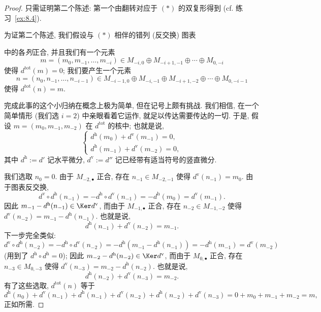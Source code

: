 \begin{proof}
只需证明第二个陈述: 第一个由翻转对应于 $(*)$ 的双复形得到 (cf. 练习~\ref{ex:8.4}).

为证第二个陈述, 我们假设与 $(*)$ 相伴的错列 (反交换) 图表
\begin{center}
\end{center}
中的各\emph{列}正合, 并且我们有一个元素
\[
m=(m_0, m_{-1}, \dots, m_{-i})\in M_{-i,0}\oplus M_{-i+1,-1}\oplus \cdots \oplus M_{0,-i}
\]
使得 $d^{\mathrm{tot}}(m)=0$; 我们要产生一个元素
\[
n=(n_0, n_{-1}, \dots, n_{-i-1})\in M_{-i-1,0}\oplus M_{-i,-1}\oplus M_{-i+1,-2}\oplus \cdots \oplus M_{0,-i-1}
\]
使得 $d^{\mathrm{tot}}(n)=m$.

完成此事的这个小归纳在概念上极为简单, 但在记号上颇有挑战. 我们相信, 在一个简单情形 (我们选 $i=2$) 中亲眼看着它运作, 就足以传达需要传达的一切. 于是, 假设 $m=(m_0,m_{-1},m_{-2})$ 在 $d^{\mathrm{tot}}$ 的核中; 也就是说,
\[
\begin{cases}
d^{\mathrm h}(m_0)+d^{\mathrm v}(m_{-1})=0,\\
d^{\mathrm h}(m_{-1})+d^{\mathrm v}(m_{-2})=0,
\end{cases}
\]
其中 $d^{\mathrm h}:=d'$ 记水平微分, $d^{\mathrm v}:=d''$ 记已经带有适当符号的竖直微分.

我们选取 $n_0=0$. 由于 $M_{-2,\bullet}$ 正合, 存在 $n_{-1}\in M_{-2,-1}$ 使得 $d^{\mathrm v}(n_{-1})=m_0$. 由于图表反交换,
\[
d^{\mathrm v}\circ d^{\mathrm h}(n_{-1})=-d^{\mathrm h}\circ d^{\mathrm v}(n_{-1})=-d^{\mathrm h}(m_0)=d^{\mathrm v}(m_{-1}).
\]
因此 $m_{-1}-d^{\mathrm h}(n_{-1})\in \Ker d^{\mathrm v}$, 而由于 $M_{-1,\bullet}$ 正合, 存在 $n_{-2}\in M_{-1,-2}$ 使得 $d^{\mathrm v}(n_{-2})=m_{-1}-d^{\mathrm h}(n_{-1})$. 也就是说,
\[
d^{\mathrm h}(n_{-1})+d^{\mathrm v}(n_{-2})=m_{-1}.
\]
下一步完全类似:
\[
d^{\mathrm v}\circ d^{\mathrm h}(n_{-2})=-d^{\mathrm h}\circ d^{\mathrm v}(n_{-2})=-d^{\mathrm h}(m_{-1}-d^{\mathrm h}(n_{-1}))=-d^{\mathrm h}(m_{-1})=d^{\mathrm v}(m_{-2})
\]
(用到了 $d^{\mathrm h}\circ d^{\mathrm h}=0$); 因此 $m_{-2}-d^{\mathrm h}(n_{-2})\in \Ker d^{\mathrm v}$, 而由于 $M_{0,\bullet}$ 正合, 存在 $n_{-3}\in M_{0,-3}$ 使得 $d^{\mathrm v}(n_{-3})=m_{-2}-d^{\mathrm h}(n_{-2})$. 也就是说,
\[
d^{\mathrm h}(n_{-2})+d^{\mathrm v}(n_{-3})=m_{-2}.
\]
有了这些选取, $d^{\mathrm{tot}}(n)$ 等于
\[
d^{\mathrm h}(n_0)+d^{\mathrm v}(n_{-1})+d^{\mathrm h}(n_{-1})+d^{\mathrm v}(n_{-2})+d^{\mathrm h}(n_{-2})+d^{\mathrm v}(n_{-3})
=0+m_0+m_{-1}+m_{-2}=m,
\]
正如所需.


\end{proof}

